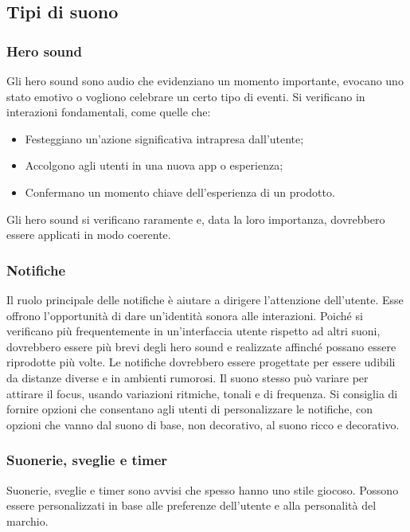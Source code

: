\documentclass[12pt, a4paper]{report}
\begin{document}
              \subsection{Tipi di suono}
              	\subsubsection{Hero sound}
              	Gli hero sound sono audio che evidenziano un momento importante, evocano uno stato emotivo o vogliono celebrare un certo tipo di eventi.
              	Si verificano in interazioni fondamentali, come quelle che:
              	\begin{itemize}
              		\item Festeggiano un'azione significativa intrapresa dall’utente;
              		\item Accolgono agli utenti in una nuova app o esperienza;
              		\item Confermano un momento chiave dell’esperienza di un prodotto.
              	\end{itemize}
              	Gli hero sound si verificano raramente e, data la loro importanza, dovrebbero essere applicati in modo coerente.


                \subsubsection{Notifiche}
                Il ruolo principale delle notifiche è aiutare a dirigere l'attenzione dell'utente. Esse offrono l'opportunità di dare un'identità sonora alle interazioni. Poiché si verificano più frequentemente in un'interfaccia
                utente rispetto ad altri suoni, dovrebbero essere più brevi degli hero sound e realizzate affinché possano essere riprodotte più volte. Le notifiche dovrebbero essere progettate per essere udibili da distanze diverse e
                in ambienti rumorosi. Il suono stesso può variare per attirare il focus, usando variazioni ritmiche, tonali e di frequenza. Si consiglia di fornire opzioni che consentano agli utenti di personalizzare le notifiche, con
                opzioni che vanno dal suono di base, non decorativo, al suono ricco e decorativo.


                \subsubsection{Suonerie, sveglie e timer}
                Suonerie, sveglie e timer sono avvisi che spesso hanno uno stile giocoso. Possono essere personalizzati in base alle preferenze dell'utente e alla personalità del marchio.
\end{document}
